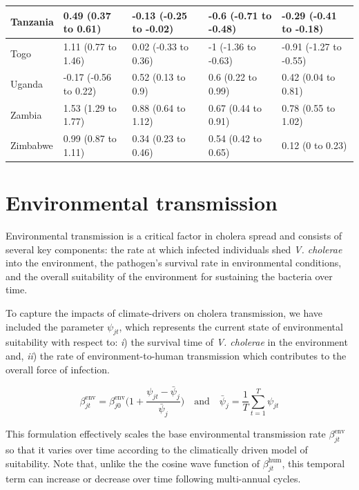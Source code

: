 \documentclass[
]{book}
\begin{document}
\begin{table}[!h]
\begin{tabular}[t]{l|l|l|l|l}
\hline
Tanzania & 0.49 (0.37 to 0.61) & -0.13 (-0.25 to -0.02) & -0.6 (-0.71 to -0.48) & -0.29 (-0.41 to -0.18)\\
\hline
Togo & 1.11 (0.77 to 1.46) & 0.02 (-0.33 to 0.36) & -1 (-1.36 to -0.63) & -0.91 (-1.27 to -0.55)\\
\hline
Uganda & -0.17 (-0.56 to 0.22) & 0.52 (0.13 to 0.9) & 0.6 (0.22 to 0.99) & 0.42 (0.04 to 0.81)\\
\hline
Zambia & 1.53 (1.29 to 1.77) & 0.88 (0.64 to 1.12) & 0.67 (0.44 to 0.91) & 0.78 (0.55 to 1.02)\\
\hline
Zimbabwe & 0.99 (0.87 to 1.11) & 0.34 (0.23 to 0.46) & 0.54 (0.42 to 0.65) & 0.12 (0 to 0.23)\\
\hline
\end{tabular}
\end{table}

\section{Environmental transmission}\label{environmental-transmission}

Environmental transmission is a critical factor in cholera spread and consists of several key components: the rate at which infected individuals shed \emph{V. cholerae} into the environment, the pathogen's survival rate in environmental conditions, and the overall suitability of the environment for sustaining the bacteria over time.

To capture the impacts of climate-drivers on cholera transmission, we have included the parameter \(\psi_{jt}\), which represents the current state of environmental suitability with respect to: \emph{i}) the survival time of \emph{V. cholerae} in the environment and, \emph{ii}) the rate of environment-to-human transmission which contributes to the overall force of infection.

\begin{equation}
\beta_{jt}^{\text{env}} = \beta_{j0}^{\text{env}} \Bigg(1 + \frac{\psi_{jt}-\bar\psi_j}{\bar\psi_j} \Bigg) \quad \text{and} \quad \bar\psi_j = \frac{1}{T} \sum_{t=1}^{T} \psi_{jt}
\label{eq:beta2}
\end{equation}

This formulation effectively scales the base environmental transmission rate \(\beta_{jt}^{\text{env}}\) so that it varies over time according to the climatically driven model of suitability. Note that, unlike the the cosine wave function of \(\beta_{jt}^{\text{hum}}\), this temporal term can increase or decrease over time following multi-annual cycles.
\end{document}
